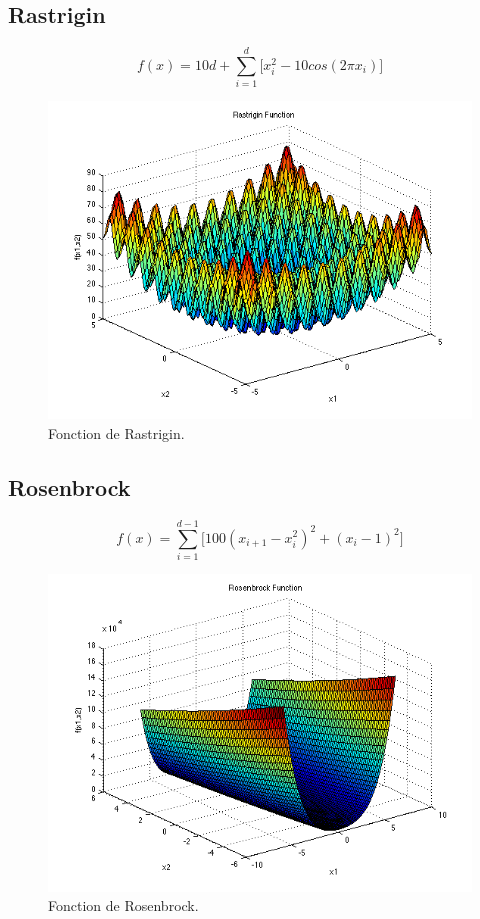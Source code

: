 \documentclass[a4paper, fontsize=11pt]{article}
\begin{document}
\subsection{Rastrigin}
\begin{equation}
f(x) = 10d + \sum_{i=1}^{d} \big[x_i^2 - 10cos(2 \pi x_i)\big]
\end{equation}

\begin{figure}[b]
\centering
\includegraphics[width=1\textwidth]{rastr.png}
\caption{\label{fig:frog}Fonction de Rastrigin.}
\end{figure}

\subsection{Rosenbrock}
\begin{equation}
f(x) = \sum_{i=1}^{d-1} \big[100(x_{i+1} - x_i^2)^2 + (x_i - 1)^2\big]
\end{equation}

\begin{figure}[b]
\centering
\includegraphics[width=1\textwidth]{rosen.png}
\caption{\label{fig:frog}Fonction de Rosenbrock.}
\end{figure}
\end{document}
